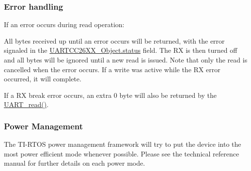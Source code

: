 \subsubsection*{Error handling}

If an error occurs during read operation\-:
\begin{DoxyItemize}
\item All bytes received up until an error occurs will be returned, with the error signaled in the \hyperlink{struct_u_a_r_t_c_c26_x_x___object_a10ff4c367c40263e72d3494f78b9ce07}{U\-A\-R\-T\-C\-C26\-X\-X\-\_\-\-Object.\-status} field. The R\-X is then turned off and all bytes will be ignored until a new read is issued. Note that only the read is cancelled when the error occurs. If a write was active while the R\-X error occurred, it will complete.
\item If a R\-X break error occurs, an extra 0 byte will also be returned by the \hyperlink{_u_a_r_t_8h_a023152d57539cad94bdd813956013e73}{U\-A\-R\-T\-\_\-read()}.
\end{DoxyItemize}\subsubsection*{Power Management}

The T\-I-\/\-R\-T\-O\-S power management framework will try to put the device into the most power efficient mode whenever possible. Please see the technical reference manual for further details on each power mode.

